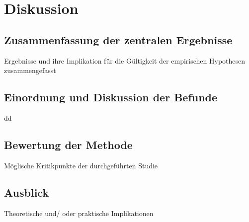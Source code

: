 \chapter{Diskussion}   \label{ch_5}
\section{Zusammenfassung der zentralen Ergebnisse}  \label{sec_5.1}
Ergebnisse und ihre Implikation für die Gültigkeit der empirischen Hypothesen zusammengefasst


\section{Einordnung und Diskussion der Befunde}     \label{sec_5.2}
dd


\section{Bewertung der Methode}
Möglische Kritikpunkte der durchgeführten Studie    \label{sec_5.3}


\section{Ausblick}
Theoretische und/ oder praktische Implikationen     \label{sec_5.4}